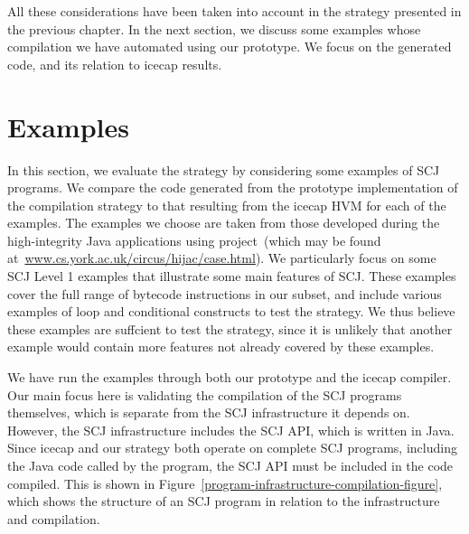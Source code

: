 All these considerations have been taken into account in the strategy
presented in the previous chapter.
In the next section, we discuss some examples whose compilation we
have automated using our prototype. 
We focus on the generated code, and its relation to icecap results.


\section{Examples}
\label{examples-section}

In this section, we evaluate the strategy by considering some examples
of SCJ programs.
We compare the code generated from the prototype implementation of the
compilation strategy to that resulting from the icecap HVM for each of
the examples.
The examples we choose are taken from those developed during the
high-integrity Java applications using \Circus{} project~(which may be
found at~\url{www.cs.york.ac.uk/circus/hijac/case.html}). 
We particularly focus on some SCJ Level 1 examples that illustrate
some main features of SCJ.
These examples cover the full range of bytecode instructions in our
subset, and include various examples of loop and conditional
constructs to test the strategy.
We thus believe these examples are suffcient to test the strategy,
since it is unlikely that another example would contain more features
not already covered by these examples.

We have run the examples through both our prototype and the icecap
compiler.
Our main focus here is validating the compilation of the SCJ programs
themselves, which is separate from the SCJ infrastructure it depends
on.
However, the SCJ infrastructure includes the SCJ API, which is written
in Java.
Since icecap and our strategy both operate on complete SCJ programs,
including the Java code called by the program, the SCJ API must be
included in the code compiled.
This is shown in
Figure~\ref{program-infrastructure-compilation-figure}, which shows
the structure of an SCJ program in relation to the infrastructure and
compilation.

